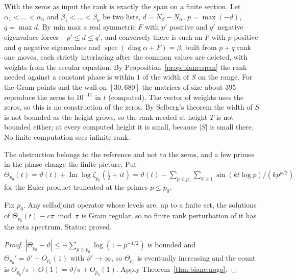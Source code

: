 \begin{remark}\label{rem:biane:rank}
With the zeros as input the rank is exactly the span on a finite section. Let $\alpha_1<\dots<\alpha_n$ and $\beta_1<\dots<\beta_n$ be two lists, $d=N_\beta-N_\alpha$, $p=\max(-d)$, $q=\max d$. By min max a real symmetric $F$ with $p'$ positive and $q'$ negative eigenvalues forces $-p'\le d\le q'$, and conversely there is such an $F$ with $p$ positive and $q$ negative eigenvalues and $\operatorname{spec}(\operatorname{diag}\alpha+F)=\beta$, built from $p+q$ rank one moves, each strictly interlacing after the common values are deleted, with weights from the secular equation. By Proposition~\ref{prop:biane:span} the rank needed against a constant phase is within $1$ of the width of $S$ on the range. For the Gram points and the wall on $[30,680]$ the matrices of size about $395$ reproduce the zeros to $10^{-11}$ in $t$ (computed). The vector of weights uses the zeros, so this is no construction of the zeros. By Selberg's theorem the width of $S$ is not bounded as the height grows, so the rank needed at height $T$ is not bounded either; at every computed height it is small, because $|S|$ is small there. No finite computation sees infinite rank.
\end{remark}

The obstruction belongs to the reference and not to the zeros, and a few primes in the phase change the finite picture. Put $\Theta_{p_0}(t)=\vartheta(t)+\operatorname{Im}\log\zeta_{p_0}(\frac12+it)=\vartheta(t)-\sum_{p\le p_0}\sum_{k\ge1}\sin(kt\log p)/(kp^{k/2})$ for the Euler product truncated at the primes $p\le p_0$.

\begin{proposition}\label{prop:biane:euler}
Fix $p_0$. Any selfadjoint operator whose levels are, up to a finite set, the solutions of $\Theta_{p_0}(t)\equiv c\pi\bmod\pi$ is Gram regular, so no finite rank perturbation of it has the zeta spectrum. Status: proved.
\end{proposition}

\begin{proof}
$|\Theta_{p_0}-\vartheta|\le-\sum_{p\le p_0}\log(1-p^{-1/2})$ is bounded and $\Theta_{p_0}'=\vartheta'+O_{p_0}(1)$ with $\vartheta'\to\infty$, so $\Theta_{p_0}$ is eventually increasing and the count is $\Theta_{p_0}/\pi+O(1)=\vartheta/\pi+O_{p_0}(1)$. Apply Theorem~\ref{thm:biane:nogo}.
\end{proof}

